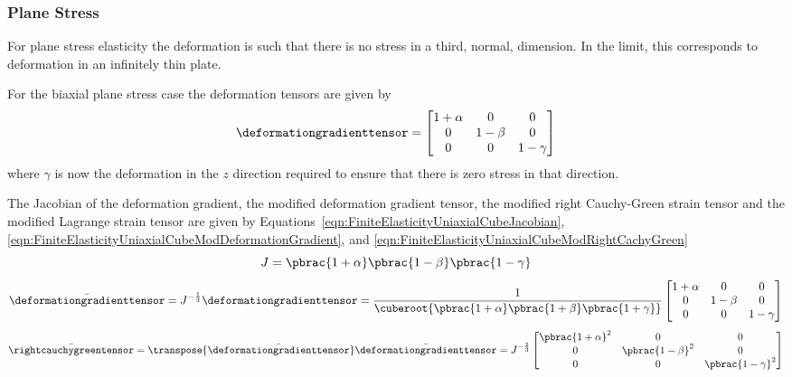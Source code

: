 \subsubsection{Plane Stress}
\label{subsubsec:FiniteElasticityPlaneStress}

For plane stress elasticity the deformation is such that there is no
stress in a third, normal, dimension. In the limit, this corresponds to deformation
in an infinitely thin plate.

For the biaxial plane stress case the deformation tensors are given by
\begin{equation}
  \deformationgradienttensor=\begin{bmatrix}
  1+\alpha & 0 & 0 \\
  0 & 1-\beta & 0 \\
  0 & 0 & 1-\gamma
  \end{bmatrix}  
\end{equation}
where $\gamma$ is now the deformation in the $z$ direction required to ensure that there is zero stress in that direction.

The Jacobian of the deformation gradient, the modified deformation
gradient tensor, the modified right Cauchy-Green strain tensor and the
modified Lagrange strain tensor are given by
Equations~\ref{eqn:FiniteElasticityUniaxialCubeJacobian},\ref{eqn:FiniteElasticityUniaxialCubeModDeformationGradient},
and \ref{eqn:FiniteElasticityUniaxialCubeModRightCachyGreen} \ie
\begin{equation}
  J=\pbrac{1+\alpha}\pbrac{1-\beta}\pbrac{1-\gamma}
\end{equation}
\begin{equation}
  \bar{\deformationgradienttensor}=J^{-\frac{1}{3}}\deformationgradienttensor=\frac{1}{\cuberoot{\pbrac{1+\alpha}\pbrac{1+\beta}\pbrac{1+\gamma}}}\begin{bmatrix}
      1+\alpha & 0 & 0 \\
      0 & 1-\beta & 0 \\
      0 & 0 & 1-\gamma
    \end{bmatrix}
\end{equation}
\begin{equation}
  \bar{\rightcauchygreentensor}=\transpose{\bar{\deformationgradienttensor}}\bar{\deformationgradienttensor}=J^{-\frac{2}{3}}\begin{bmatrix}
    \pbrac{1+\alpha}^{2} & 0 & 0 \\
    0 & \pbrac{1-\beta}^{2} & 0  \\
    0 & 0 & \pbrac{1-\gamma}^{2}
  \end{bmatrix}
\end{equation}

